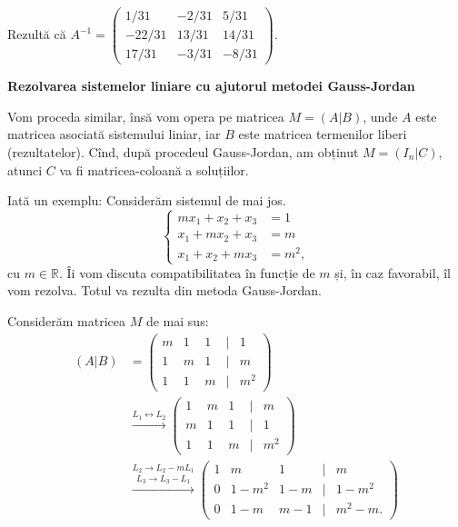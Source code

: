 \documentclass[11pt,a4paper]{article}
\newcommand\RR{\mathbb{R}}
\theoremstyle{dotless}
\theoremstyle{dotlessdr}
\begin{document}
Rezultă că $A^{-1} = \begin{pmatrix} 1/31 & -2/31 & 5/31 \\
  -22/31 & 13/31 & 14/31 \\
  17/31 & -3/31 & -8/31
\end{pmatrix}$.


\textbf{Rezolvarea sistemelor liniare cu ajutorul metodei Gauss-Jordan}

Vom proceda similar, însă vom opera pe matricea $M = (A | B)$, unde
$A$ este matricea asociată sistemului liniar, iar $B$ este matricea
termenilor liberi (rezultatelor). Cînd, după procedeul Gauss-Jordan,
am obținut $M = (I_n | C)$, atunci $C$ va fi matricea-coloană a soluțiilor.

Iată un exemplu: Considerăm sistemul de mai jos.
\[
  \begin{cases}
    mx_1 + x_2 + x_3  &= 1 \\
    x_1 + mx_2 + x_3 &= m \\
    x_1 + x_2 + mx_3 &= m^2,
  \end{cases}
\]
cu $m \in \RR$. Îi vom discuta compatibilitatea în funcție de $m$ și, în caz
favorabil, îl vom rezolva. Totul va rezulta din metoda Gauss-Jordan.

Considerăm matricea $M$ de mai sus:
\begin{align*}
  (A | B) &= \begin{pmatrix}
    m & 1 & 1 & \mid & 1 \\
    1 & m & 1 & \mid & m \\
    1 & 1 & m & \mid & m^2
  \end{pmatrix} \\
  &\xrightarrow{L_1 \leftrightarrow L_2}
  \begin{pmatrix}
    1 & m & 1 & \mid & m \\
    m & 1 & 1 & \mid & 1 \\
    1 & 1 & m & \mid & m^2
  \end{pmatrix} \\
  &\stackrel{L_2 \to L_2 - mL_1}{\xrightarrow{L_3 \to L_3 - L_1}}
  \begin{pmatrix}
    1 & m & 1 & \mid & m \\
    0 & 1 - m^2 & 1 - m & \mid & 1 - m^2 \\
    0 & 1 - m & m - 1 & \mid & m^2 - m.
  \end{pmatrix}
\end{align*}
\end{document}
